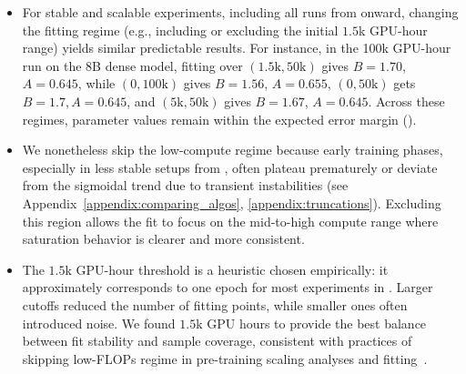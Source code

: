 \documentclass[]{fairmeta} %
\begin{document}
\begin{itemize}
    \item For stable and scalable experiments, including all runs from  onward, changing the fitting regime (e.g., including or excluding the initial $1.5$k GPU-hour range) yields similar predictable results.
    For instance, in the 100k GPU-hour run on the 8B dense model, fitting over $(1.5\text{k}, 50\text{k})$ gives $B = 1.70$, $A = 0.645$, while $(0, 100\text{k})$ gives $B = 1.56$, $A = 0.655$, $(0, 50\text{k})$ gets $B=1.7, A=0.645$, and $(5\text{k}, 50\text{k})$ gives $B = 1.67$, $A = 0.645$. Across these regimes, parameter values remain within the expected error margin ().

    \item We nonetheless skip the low-compute regime because early training phases, especially in less stable setups from , often plateau prematurely or deviate from the sigmoidal trend due to transient instabilities (see Appendix~\ref{appendix:comparing_algos}, \ref{appendix:truncations}).
    Excluding this region allows the fit to focus on the mid-to-high compute range where saturation behavior is clearer and more consistent.

    \item The $1.5$k GPU-hour threshold is a heuristic chosen empirically: it approximately corresponds to one epoch for most experiments in .
    Larger cutoffs reduced the number of fitting points, while smaller ones often introduced noise.
    We found $1.5$k GPU hours to provide the best balance between fit stability and sample coverage, consistent with practices of skipping low-FLOPs regime in pre-training scaling analyses and fitting~\citep{misfitting}.

\end{itemize}
\end{document}
